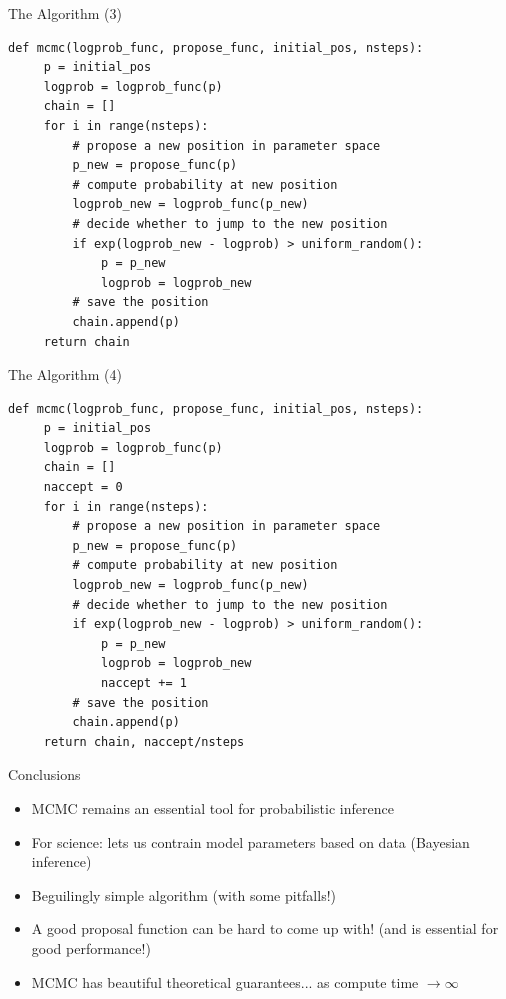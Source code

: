\documentclass{beamer}
\begin{document}
\begin{frame}[fragile]{The Algorithm (3)}
\begin{small}
\begin{verbatim}
def mcmc(logprob_func, propose_func, initial_pos, nsteps):
     p = initial_pos
     logprob = logprob_func(p)
     chain = []
     for i in range(nsteps):
         # propose a new position in parameter space
         p_new = propose_func(p)
         # compute probability at new position
         logprob_new = logprob_func(p_new)
         # decide whether to jump to the new position
         if exp(logprob_new - logprob) > uniform_random():
             p = p_new
             logprob = logprob_new
         # save the position
         chain.append(p)
     return chain
\end{verbatim}
\end{small}
\end{frame}

\begin{frame}[fragile]{The Algorithm (4)}
\begin{small}
\begin{verbatim}
def mcmc(logprob_func, propose_func, initial_pos, nsteps):
     p = initial_pos
     logprob = logprob_func(p)
     chain = []
     naccept = 0
     for i in range(nsteps):
         # propose a new position in parameter space
         p_new = propose_func(p)
         # compute probability at new position
         logprob_new = logprob_func(p_new)
         # decide whether to jump to the new position
         if exp(logprob_new - logprob) > uniform_random():
             p = p_new
             logprob = logprob_new
             naccept += 1
         # save the position
         chain.append(p)
     return chain, naccept/nsteps
\end{verbatim}
\end{small}
\end{frame}

%
%
%

\begin{frame}{Conclusions}
\begin{itemize}
\item MCMC remains an essential tool for probabilistic inference
\item For science: lets us contrain model parameters based on data (Bayesian inference)
\item Beguilingly simple algorithm (with some pitfalls!)
\item A good proposal function can be hard to come up with! (and is essential for good performance!)
\item MCMC has beautiful theoretical guarantees... as compute time $\to \infty$
\end{itemize}
\end{frame}
\end{document}
